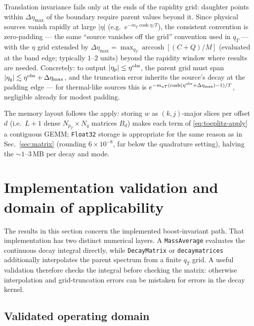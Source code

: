 \documentclass[11pt]{article}
\begin{document}
Translation invariance fails only at the ends of the rapidity grid:
daughter points within $\Delta\eta_{\max}$ of the boundary require parent
values beyond it.  Since physical sources vanish rapidly at large $|\eta|$
(e.g.\ $e^{-m_T\cosh\eta/T}$), the consistent convention is zero-padding
--- the same ``source vanishes off the grid'' convention used in $q_T$ ---
with the $\eta$ grid extended by $\Delta\eta_{\max}=
\max_{q_T}\operatorname{arccosh}[(C+Q)/M]$ (evaluated at the band edge;
typically $1$--$2$ units) beyond the rapidity window where results are
needed.  Concretely: to output $|\eta_p|\le\eta^{\rm obs}$, the parent
grid must span $|\eta_q|\lesssim\eta^{\rm obs}+\Delta\eta_{\max}$, and
the truncation error inherits the source's decay at the padding edge ---
for thermal-like sources this is
$e^{-m_{aT}(\cosh(\eta^{\rm obs}+\Delta\eta_{\max})-1)/T}$, negligible
already for modest padding.

The memory layout follows the apply: storing $w$ as
$(k,j)$-major slices per offset $d$ (i.e.\ $L{+}1$ dense
$N_{p_T}\times N_q$ matrices $B_d$) makes each term of
\eqref{eq:toeplitz-apply} a contiguous GEMM; \texttt{Float32} storage is
appropriate for the same reason as in Sec.~\ref{sec:matrix} (rounding
$6\times10^{-8}$, far below the quadrature setting), halving the
$\sim1$--$3$\,MB per decay and mode.

\section{Implementation validation and domain of applicability}
\label{sec:validation}

The results in this section concern the implemented boost-invariant path.
That implementation has two distinct numerical layers.  A
\texttt{MassAverage} evaluates the continuous decay integral directly, while
\texttt{DecayMatrix} or \texttt{decaymatrices} additionally interpolates the
parent spectrum from a finite $q_T$ grid.  A useful validation therefore
checks the integral before checking the matrix: otherwise interpolation and
grid-truncation errors can be mistaken for errors in the decay kernel.

\subsection{Validated operating domain}
\end{document}

